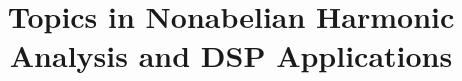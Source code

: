 \title{Topics in Nonabelian Harmonic Analysis and DSP Applications}
\address{Textron Systems; Hawaii, USA\\
{\small \tt williamdemeo@yahoo.com}
}

%
